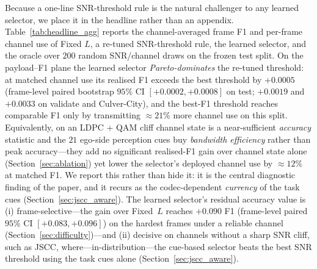 \documentclass[journal]{IEEEtran}
\begin{document}
Because a one-line SNR-threshold rule is the natural challenger to any learned selector, we place it in the headline rather than an appendix. Table~\ref{tab:headline_agg} reports the channel-averaged frame F1 and per-frame channel use of Fixed $L$, a re-tuned SNR-threshold rule, the learned selector, and the oracle over $200$ random SNR/channel draws on the frozen test split. On the payload--F1 plane the learned selector \emph{Pareto-dominates} the re-tuned threshold: at matched channel use its realised F1 exceeds the best threshold by $+0.0005$ (frame-level paired bootstrap $95\%$ CI $[+0.0002,+0.0008]$ on test; $+0.0019$ and $+0.0033$ on validate and Culver-City), and the best-F1 threshold reaches comparable F1 only by transmitting ${\approx}21\%$ more channel use on this split. Equivalently, on an LDPC + QAM cliff channel state is a near-sufficient \emph{accuracy} statistic and the $21$ ego-side perception cues buy \emph{bandwidth efficiency} rather than peak accuracy---they add no significant realised-F1 gain over channel state alone (Section~\ref{sec:ablation}) yet lower the selector's deployed channel use by ${\approx}12\%$ at matched F1. We report this rather than hide it: it is the central diagnostic finding of the paper, and it recurs as the codec-dependent \emph{currency} of the task cues (Section~\ref{sec:jscc_aware}). The learned selector's residual accuracy value is (i) frame-selective---the gain over Fixed~$L$ reaches $+0.090$ F1 (frame-level paired $95\%$ CI $[+0.083,+0.096]$) on the hardest frames under a reliable channel (Section~\ref{sec:difficulty})---and (ii) decisive on channels without a sharp SNR cliff, such as JSCC, where---in-distribution---the cue-based selector beats the best SNR threshold using the task cues alone (Section~\ref{sec:jscc_aware}).
\end{document}
